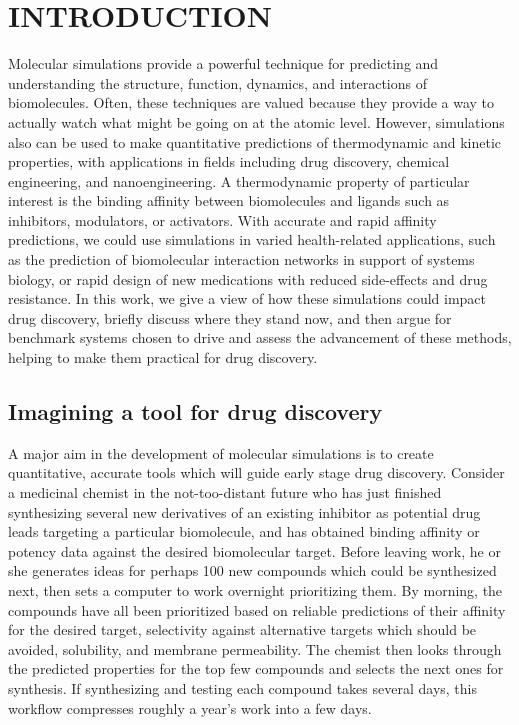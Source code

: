 \documentclass[aps,pre,twocolumn,nofootinbib,superscriptaddress,10pt, final,tightenlines]{revtex4-1}
\begin{document}
\maketitle



\section{INTRODUCTION}

Molecular simulations provide a powerful technique for predicting and understanding the structure, function, dynamics, and interactions of biomolecules. 
Often, these techniques are valued because they provide a way to actually watch what might be going on at the atomic level. 
However, simulations also can be used to make quantitative predictions of thermodynamic and kinetic properties, with applications in fields including drug discovery, chemical engineering, and nanoengineering. 
A thermodynamic property of particular interest is the binding affinity between biomolecules and ligands such as inhibitors, modulators, or activators. 
With accurate and rapid affinity predictions, we could use simulations in varied health-related applications, such as the prediction of biomolecular interaction networks in support of systems biology, or rapid design of new medications with reduced side-effects and drug resistance.
In this work, we give a view of how these simulations could impact drug discovery, briefly discuss where they stand now, and then argue for benchmark systems chosen to drive and assess the advancement of these methods, helping to make them practical for drug discovery.

\subsection{Imagining a tool for drug discovery}
A major aim in the development of molecular simulations is to create quantitative, accurate tools which will guide early stage drug discovery. 
Consider a medicinal chemist in the not-too-distant future who has just finished synthesizing several new derivatives of an existing inhibitor as potential drug leads targeting a particular biomolecule, and has obtained binding affinity or potency data against the desired biomolecular target. 
Before leaving work, he or she generates ideas for perhaps 100 new compounds which could be synthesized next, then sets a computer to work overnight prioritizing them. 
By morning, the compounds have all been prioritized based on reliable predictions of their affinity for the desired target, selectivity against alternative targets which should be avoided, solubility, and membrane permeability.  
The chemist then looks through the predicted properties for the top few compounds and selects the next ones for synthesis. 
If synthesizing and testing each compound takes several days, this workflow compresses roughly a year's work into a few days.
\end{document}
